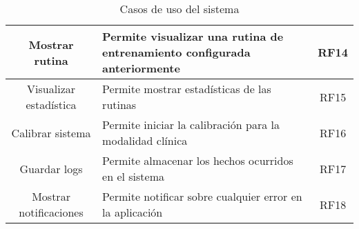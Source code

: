 \begin{table}[!ht]
\begin{tabularx}{\textwidth}{|c|X|c|}
        Mostrar rutina & Permite visualizar una rutina de entrenamiento configurada anteriormente &RF14\\\hline
        Visualizar estadística & Permite mostrar estadísticas de las rutinas & RF15\\\hline
        Calibrar sistema & Permite iniciar la calibración para la modalidad clínica  & RF16\\\hline
        Guardar logs & Permite almacenar los hechos ocurridos en el sistema & RF17\\\hline
        Mostrar notificaciones & Permite notificar sobre cualquier error en la aplicación & RF18\\\hline
    \end{tabularx}
    \caption{Casos de uso del sistema}
    \label{tab: rf}
\end{table}

\newpage


